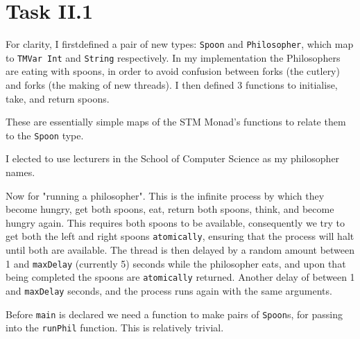 \documentclass[12pt]{article}
\begin{document}
\maketitle
\tableofcontents

\section{Task II.1}



For clarity, I firstdefined a pair of new types: \verb|Spoon| and \verb|Philosopher|, which map to \verb|TMVar Int| and \verb|String| respectively.
In my implementation the Philosophers are eating with spoons, in order to avoid confusion between forks (the cutlery) and forks (the making of new threads).
I then defined 3 functions to initialise, take, and return spoons.



These are essentially simple maps of the STM Monad's functions to relate them to the \verb|Spoon| type.



I elected to use lecturers in the School of Computer Science as my philosopher names.



Now for "running a philosopher".
This is the infinite process by which they become hungry, get both spoons, eat, return both spoons, think, and become hungry again.
This requires both spoons to be available, consequently we try to get both the left and right spoons \verb|atomically|, ensuring that the process will halt until both are available.
The thread is then delayed by a random amount between 1 and \verb|maxDelay| (currently 5) seconds while the philosopher eats, and upon that being completed the spoons are \verb|atomically| returned.
Another delay of between 1 and \verb|maxDelay| seconds, and the process runs again with the same arguments.



Before \verb|main| is declared we need a function to make pairs of \verb|Spoon|s, for passing into the \verb|runPhil| function.
This is relatively trivial.


\end{document}
